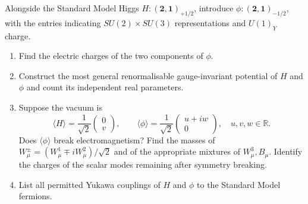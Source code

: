 Alongside the Standard Model Higgs
$H:(\mathbf2,\mathbf1)_{+1/2}$, introduce
$\phi:(\mathbf2,\mathbf1)_{-1/2}$, with the entries indicating
$SU(2)\times SU(3)$ representations and $U(1)_Y$ charge.
\begin{enumerate}[label=\roman*)]
    \item Find the electric charges of the two components of $\phi$.
    \item Construct the most general renormalisable gauge-invariant
    potential of $H$ and $\phi$ and count its independent real
    parameters.
    \item Suppose the vacuum is
    \begin{equation}
        \langle H\rangle=\frac1{\sqrt2}
        \begin{pmatrix}0\\v\end{pmatrix},
        \qquad
        \langle\phi\rangle=\frac1{\sqrt2}
        \begin{pmatrix}u+iw\\0\end{pmatrix},
        \quad u,v,w\in\mathbb R.
    \end{equation}
    Does $\langle\phi\rangle$ break electromagnetism?
    Find the masses of $W_\mu^\pm=(W_\mu^1\mp iW_\mu^2)/\sqrt2$
    and of the appropriate mixtures of $W_\mu^3,B_\mu$.
    Identify the charges of the scalar modes remaining after
    symmetry breaking.
    \item List all permitted Yukawa couplings of $H$ and $\phi$
    to the Standard Model fermions.
\end{enumerate}
